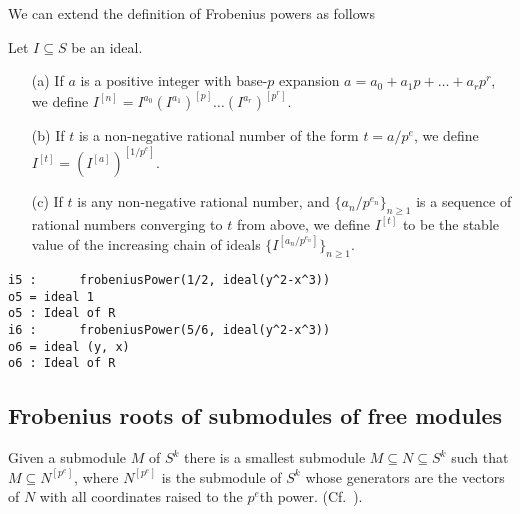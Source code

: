 \documentclass[11pt]{amsart}
\begin{document}
We can extend the definition of Frobenius powers as follows
\begin{definition}
Let  $I\subseteq S$ be an ideal.
\begin{enumerate}
 \item[(a)] If $a$ is a positive integer with base-$p$ expansion  $a=a_0 + a_1 p +  \dots + a_r p^r$, we define
 $I^{[n]}=I^{a_0} \left(I^{a_1}\right)^{[p]} \dots  (I^{a_r})^{[p^r]}$. %
 \item[(b)] If $t$ is a non-negative rational number of the form $t = a/p^e$, we define  $I^{[t]} = (I^{[a]})^{[1/p^e]}.$
 \item[(c)] If $t$ is any non-negative rational number, and $\{a_n/p^{e_n}\}_{n\geq 1}$ is a sequence of rational numbers converging to $t$ from above, we define $I^{[t]}$
 to be the stable value of the increasing chain of ideals $\{I^{[a_n/p^{e_n}]}\}_{n\geq 1}$.

\end{enumerate}
\end{definition}


\begin{verbatim}
i5 :      frobeniusPower(1/2, ideal(y^2-x^3))
o5 = ideal 1
o5 : Ideal of R
i6 :      frobeniusPower(5/6, ideal(y^2-x^3))
o6 = ideal (y, x)
o6 : Ideal of R
\end{verbatim}

\subsection{Frobenius  roots of submodules of free modules}

Given a submodule $M$ of $S^k$ there is a smallest submodule $M \subseteq N \subseteq S^k$ such that $M\subseteq N^{[p^e]}$, where
$N^{[p^e]}$ is the submodule  of $S^k$ whose generators are the vectors of $N$ with all coordinates raised to the $p^e$th power. (Cf.~\cite{KatzmanZhangAlgorithm}).
\end{document}
